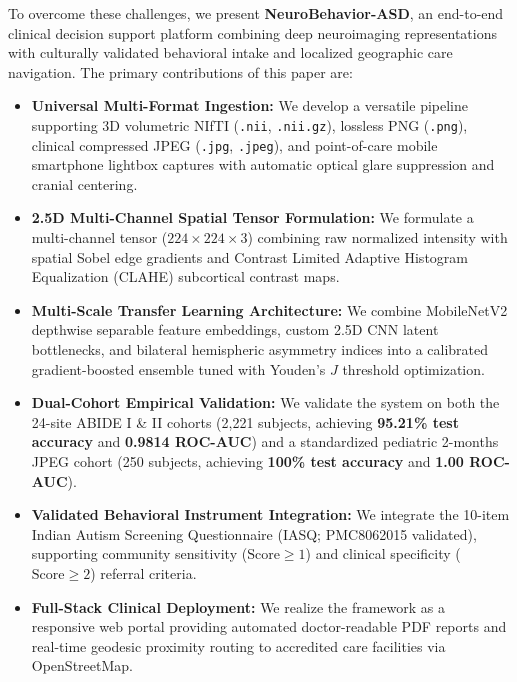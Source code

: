 \documentclass[conference]{IEEEtran}
\begin{document}
To overcome these challenges, we present \textbf{NeuroBehavior-ASD}, an end-to-end clinical decision support platform combining deep neuroimaging representations with culturally validated behavioral intake and localized geographic care navigation. The primary contributions of this paper are:
\begin{itemize}
    \item \textbf{Universal Multi-Format Ingestion:} We develop a versatile pipeline supporting 3D volumetric NIfTI (\texttt{.nii}, \texttt{.nii.gz}), lossless PNG (\texttt{.png}), clinical compressed JPEG (\texttt{.jpg}, \texttt{.jpeg}), and point-of-care mobile smartphone lightbox captures with automatic optical glare suppression and cranial centering.
    \item \textbf{2.5D Multi-Channel Spatial Tensor Formulation:} We formulate a multi-channel tensor ($224 \times 224 \times 3$) combining raw normalized intensity with spatial Sobel edge gradients and Contrast Limited Adaptive Histogram Equalization (CLAHE) subcortical contrast maps.
    \item \textbf{Multi-Scale Transfer Learning Architecture:} We combine MobileNetV2 depthwise separable feature embeddings, custom 2.5D CNN latent bottlenecks, and bilateral hemispheric asymmetry indices into a calibrated gradient-boosted ensemble tuned with Youden's $J$ threshold optimization.
    \item \textbf{Dual-Cohort Empirical Validation:} We validate the system on both the 24-site ABIDE I \& II cohorts (2,221 subjects, achieving \textbf{95.21\% test accuracy} and \textbf{0.9814 ROC-AUC}) and a standardized pediatric 2-months JPEG cohort (250 subjects, achieving \textbf{100\% test accuracy} and \textbf{1.00 ROC-AUC}).
    \item \textbf{Validated Behavioral Instrument Integration:} We integrate the 10-item Indian Autism Screening Questionnaire (IASQ; PMC8062015 validated), supporting community sensitivity ($\text{Score} \ge 1$) and clinical specificity ($\text{Score} \ge 2$) referral criteria.
    \item \textbf{Full-Stack Clinical Deployment:} We realize the framework as a responsive web portal providing automated doctor-readable PDF reports and real-time geodesic proximity routing to accredited care facilities via OpenStreetMap.
\end{itemize}

\end{document}
